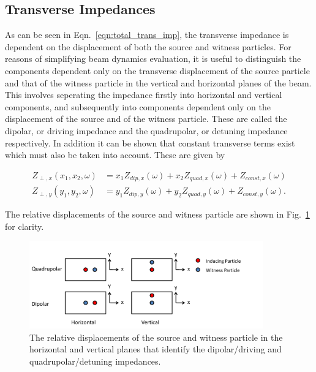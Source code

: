 \subsection{Transverse Impedances}

As can be seen in Eqn.~\ref{eqn:total_trans_imp}, the transverse impedance is dependent on the displacement of both the source and witness particles. For reasons of simplifying beam dynamics evaluation, it is useful to distinguish the components dependent only on the transverse displacement of the source particle and that of the witness particle in the vertical and horizontal planes of the beam. This involves seperating the impedance firstly into horizontal and vertical components, and subsequently into components dependent only on the displacement of the source and of the witness particle. These are called the dipolar, or driving impedance and the quadrupolar, or detuning impedance respectively. In addition it can be shown that constant transverse terms exist which must also be taken into account. These are given by

\begin{align}
Z_{\perp, x} \left( x_{1}, x_{2}, \omega \right) &= x_{1}Z_{dip, x} \left( \omega  \right) + x_{2} Z_{quad, x} \left( \omega  \right) + Z_{const, x} \left( \omega  \right) \\
Z_{\perp, y} \left( y_{1}, y_{2}, \omega \right) &= y_{1} Z_{dip, y} \left( \omega  \right) + y_{2} Z_{quad, y} \left( \omega  \right) + Z_{const, y} \left( \omega  \right).
\end{align}

The relative displacements of the source and witness particle are shown in Fig.~\ref{fig:trans_imp_disp} for clarity.

\begin{figure}
\begin{center}
\includegraphics[width=0.9\textwidth]{Wakefields_and_Impedances/figures/impedance-des.pdf}
\end{center}
\caption{The relative displacements of the source and witness particle in the horizontal and vertical planes that identify the dipolar/driving and quadrupolar/detuning impedances.}
\label{fig:trans_imp_disp}
\end{figure}

